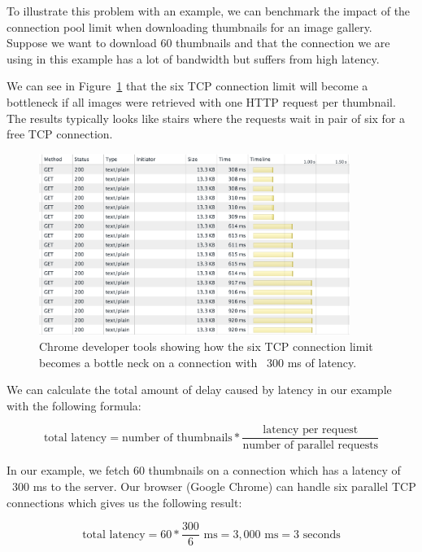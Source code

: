 \documentclass{cslthse-msc}
\begin{document}
To illustrate this problem with an example, we can benchmark the impact of the connection pool limit when downloading thumbnails for an image gallery. Suppose we want to download 60 thumbnails and that the connection we are using in this example has a lot of bandwidth but suffers from high latency.

We can see in Figure~\ref{fig:tcp_bottleneck} that the six TCP connection limit will become a bottleneck if all images were retrieved with one HTTP request per thumbnail. The results typically looks like stairs where the requests wait in pair of  six for a free TCP connection.

\begin{figure}[H]
  \centering
    \begin{center}
      \includegraphics[width=0.9\textwidth]{images/chrome_latency_limit.png}
    \end{center}
  \caption{Chrome developer tools showing how the six TCP connection limit becomes a bottle neck on a connection with ~300 ms of latency.}
  \label{fig:tcp_bottleneck}
\end{figure}

We can calculate the total amount of delay caused by latency in our example with the following formula:

\begin{equation}
\mbox{total latency} = \mbox{number of thumbnails} * \frac{\mbox{latency per request}}{\mbox{number of parallel requests}}
\end{equation}

In our example, we fetch 60 thumbnails on a connection which has a latency of ~300 ms to the server. Our browser (Google Chrome) can handle six parallel TCP connections which gives us the following result:

\begin{equation}
\mbox{total latency} = 60 * \frac{300}{6} \mbox{ ms}= 3,000 \mbox{ ms} = 3 \mbox{ seconds}
\end{equation}
\end{document}

